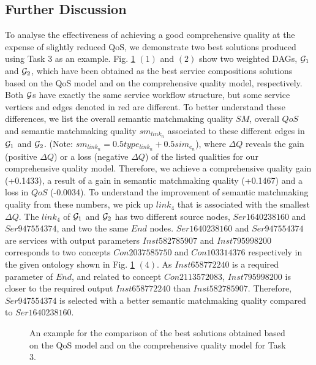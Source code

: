 \subsection{Further Discussion}\label{discuss1}
To analyse the effectiveness of achieving a good comprehensive quality at the expense of slightly reduced QoS, we demonstrate two best solutions produced using Task 3 as an example. Fig. \ref{comparisontest} $(1)$ and $(2)$ show two weighted DAGs, $\mathcal{G}_1$ and $\mathcal{G}_2$, which have been obtained as the best service compositions solutions based on the QoS model and on the comprehensive quality model, respectively. Both $\mathcal{G}$s have exactly the same service workflow structure, but some service vertices and edges denoted in red are different. To better understand these differences, we list the overall semantic matchmaking quality $SM$,  overall $QoS$ and semantic matchmaking quality $sm_{link_n}$ associated to these different edges in $\mathcal{G}_1$ and $\mathcal{G}_2$. (Note: $sm_{link_n} = 0.5type_{link_n} + 0.5 sim_{e_n}$), where $\Delta Q$ reveals the gain (positive $\Delta Q$) or a loss (negative $\Delta Q$) of the listed qualities for our comprehensive quality model. Therefore, we achieve a comprehensive quality gain (+0.1433), a result of a gain in semantic matchmaking quality (+0.1467) and a loss in $QoS$ (-0.0034). To understand the improvement of semantic matchmaking quality from these numbers, we pick up $link_4$ that is associated with the smallest $\Delta Q$. The $link_4$ of $\mathcal{G}_1$ and $\mathcal{G}_2$ has two different source nodes, $Ser1640238160$ and $Ser947554374$, and two the same $End$ nodes. $Ser1640238160$ and $Ser947554374$ are services with output parameters $Inst582785907$ and  $Inst795998200$ corresponds to two concepts $Con2037585750$ and $Con103314376$ respectively in the given ontology shown in Fig. \ref{comparisontest} $(4)$. As $Inst658772240$ is a required parameter of $End$, and related to concept $Con2113572083$, $Inst795998200$ is closer to the required output $Inst658772240$ than $Inst582785907$. Therefore,  $Ser947554374$ is selected with a better semantic matchmaking quality compared to $Ser1640238160$.
\begin{figure}[h]
 \caption{An example for the comparison of the best solutions obtained based on the QoS model and on the comprehensive quality model for Task 3.}
 \label{comparisontest}
\end{figure}

